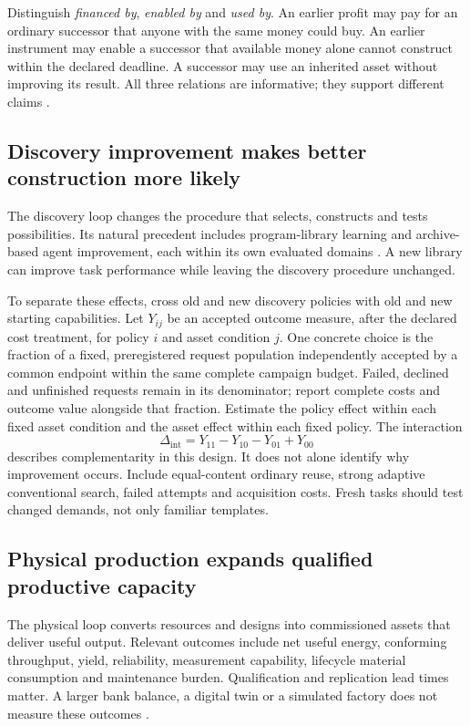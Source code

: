 \documentclass[11pt,letterpaper]{article}
\begin{document}
Distinguish \emph{financed by}, \emph{enabled by} and \emph{used by}. An earlier profit may pay for an ordinary successor that anyone with the same money could buy. An earlier instrument may enable a successor that available money alone cannot construct within the declared deadline. A successor may use an inherited asset without improving its result. All three relations are informative; they support different claims \cite{outevolve,flywheel11}.

\subsection{Discovery improvement makes better construction more likely}
The discovery loop changes the procedure that selects, constructs and tests possibilities. Its natural precedent includes program-library learning and archive-based agent improvement, each within its own evaluated domains \cite{dreamcoder,dgm}. A new library can improve task performance while leaving the discovery procedure unchanged.

To separate these effects, cross old and new discovery policies with old and new starting capabilities. Let $Y_{ij}$ be an accepted outcome measure, after the declared cost treatment, for policy $i$ and asset condition $j$. One concrete choice is the fraction of a fixed, preregistered request population independently accepted by a common endpoint within the same complete campaign budget. Failed, declined and unfinished requests remain in its denominator; report complete costs and outcome value alongside that fraction. Estimate the policy effect within each fixed asset condition and the asset effect within each fixed policy. The interaction
\begin{equation}
\Delta_{\mathrm{int}}=Y_{11}-Y_{10}-Y_{01}+Y_{00}
\end{equation}
describes complementarity in this design. It does not alone identify why improvement occurs. Include equal-content ordinary reuse, strong adaptive conventional search, failed attempts and acquisition costs. Fresh tasks should test changed demands, not only familiar templates.

\subsection{Physical production expands qualified productive capacity}
The physical loop converts resources and designs into commissioned assets that deliver useful output. Relevant outcomes include net useful energy, conforming throughput, yield, reliability, measurement capability, lifecycle material consumption and maintenance burden. Qualification and replication lead times matter. A larger bank balance, a digital twin or a simulated factory does not measure these outcomes \cite{frontier}.
\end{document}
